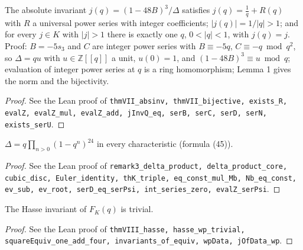 \begin{theorem}
\label{thm:VII}
\leanok
The absolute invariant $j(q)=(1-48B)^3/\Delta$ satisfies $j(q)=\frac1q+R(q)$ with $R$ a universal power series with integer coefficients; $|j(q)|=1/|q|>1$; and for every $j\in K$ with $|j|>1$ there is exactly one $q$, $0<|q|<1$, with $j(q)=j$. Proof: $B=-5s_3$ and $C$ are integer power series with $B\equiv-5q$, $C\equiv-q\bmod q^2$, so $\Delta=qu$ with $u\in\mathbb Z[[q]]$ a unit, $u(0)=1$, and $(1-48B)^3\equiv u\bmod q$; evaluation of integer power series at $q$ is a ring homomorphism; Lemma 1 gives the norm and the bijectivity.
\end{theorem}
\begin{proof}
\leanok
See the Lean proof of \texttt{thmVII\_absinv, thmVII\_bijective, exists\_R, evalZ, evalZ\_mul, evalZ\_add, jInvQ\_eq, serB, serC, serD, serN, exists\_serU}.
\end{proof}

\begin{remark}
\label{rem:delta-product}
\leanok
$\Delta=q\prod_{n>0}(1-q^n)^{24}$ in every characteristic (formula (45)).
\end{remark}
\begin{proof}
\leanok
See the Lean proof of \texttt{remark3\_delta\_product, delta\_product\_core, cubic\_disc, Euler\_identity, thK\_triple, eq\_const\_mul\_Mb, Nb\_eq\_const, ev\_sub, ev\_root, serD\_eq\_serPsi, int\_series\_zero, evalZ\_serPsi}.
\end{proof}

\begin{theorem}
\label{thm:VIII}
\leanok
The Hasse invariant of $F_K(q)$ is trivial.
\end{theorem}
\begin{proof}
\leanok
See the Lean proof of \texttt{thmVIII\_hasse, hasse\_wp\_trivial, squareEquiv\_one\_add\_four, invariants\_of\_equiv, wpData, jOfData\_wp}.
\end{proof}

